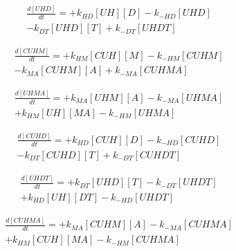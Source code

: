 \begin{equation}
\begin{split}
\frac{d[UHD]}{dt} = + k_{HD}[UH][D] - k_{-HD}[UHD] \\%
                    - k_{DT}[UHD][T] + k_{-DT}[UHDT] %
\end{split}
\end{equation}

\begin{equation}
\begin{split}
\frac{d[CUHM]}{dt} = + k_{HM}[CUH][M] - k_{-HM}[CUHM] \\%
                     - k_{MA}[CUHM][A] + k_{-MA}[CUHMA] %
\end{split}
\end{equation}

\begin{equation}
\begin{split}
\frac{d[UHMA]}{dt} = + k_{MA}[UHM][A] - k_{-MA}[UHMA] \\%
                     + k_{HM}[UH][MA] - k_{-HM}[UHMA] %
\end{split}
\end{equation}

\begin{equation}
\begin{split}
\frac{d[CUHD]}{dt} = + k_{HD}[CUH][D] - k_{-HD}[CUHD] \\%
                     - k_{DT}[CUHD][T] + k_{-DT}[CUHDT] %
\end{split}
\end{equation}

\begin{equation}
\begin{split}
\frac{d[UHDT]}{dt} = + k_{DT}[UHD][T] - k_{-DT}[UHDT] \\%
                     + k_{HD}[UH][DT] - k_{-HD}[UHDT] %
\end{split}
\end{equation}

\begin{equation}
\begin{split}
\frac{d[CUHMA]}{dt} = + k_{MA}[CUHM][A] - k_{-MA}[CUHMA] \\%
                     + k_{HM}[CUH][MA] - k_{-HM}[CUHMA] %
\end{split}
\end{equation}

